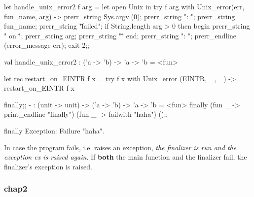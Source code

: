 \begin{enumerate}
  \begin{redcode}
let handle_unix_error2 f arg = let open Unix in 
  try
     f arg
  with Unix_error(err, fun_name, arg) ->
  prerr_string Sys.argv.(0);
  prerr_string ": \"";
  prerr_string fun_name;
  prerr_string "\" failed";
  if String.length arg > 0 then begin
     prerr_string " on \"";
     prerr_string arg;
     prerr_string "\"" end;
     prerr_string ": ";
     prerr_endline (error_message err);
     exit 2;;  
   \end{redcode}
   
   \begin{bluetext}
val handle_unix_error2 : ('a -> 'b) -> 'a -> 'b = <fun>     
\end{bluetext}

\begin{bluetext}
  let rec restart_on_EINTR f x =
  try f x with Unix_error (EINTR, _, _) -> restart_on_EINTR f x  
\end{bluetext}

\begin{alternate}
finally;;
- : (unit -> unit) -> ('a -> 'b) -> 'a -> 'b = <fun>
finally (fun _ -> print_endline "finally") (fun _ -> failwith "haha") ();;
\end{alternate}
\begin{bluecode}
finally
Exception: Failure "haha".
\end{bluecode}

In case the program fails, i.e. raises an exception, \textit{the finalizer is
run and the exception  ex is raised again}. If \textbf{both} the main function
and the finalizer fail, the finalizer's exception is raised.
\end{enumerate}

\subsubsection{chap2}
\label{sec:chap2}

